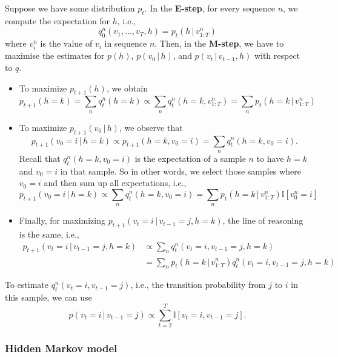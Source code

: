 \documentclass{article}
\newcommand{\giv}{\,|\,}
\begin{document}
Suppose we have some distribution $p_t$. In the \textbf{E-step}, for every sequence $n$, we compute the expectation for $h$, i.e., 
$$
    q_0^n(v_1, \dots, v_T, h) = p_t(h \giv v_{1:T}^n)
$$
\noindent where $v_i^n$ is the value of $v_i$ in sequence $n$. Then, in the \textbf{M-step}, we have to maximise the estimates for $p(h)$, $p(v_0 \giv h)$, and $p(v_t \giv v_{t-1}, h)$ with respect to $q$. 
\begin{itemize}
    \item To maximize $p_{t+1}(h)$, we obtain
    $$
        p_{t+1}(h=k) = \sum_n q_t^n(h=k) \propto \sum_n q_t^n(h=k, v_{1:T}^n) = \sum_n p_t(h=k \giv v_{1:T}^n)
    $$
    \item To maximize $p_{t+1}(v_0 \giv h)$, we observe that
    $$
        p_{t+1}(v_0 = i \giv h = k) \propto p_{t+1}(h = k, v_0 = i) = \sum_n q_t^n(h=k, v_0 = i).
    $$
    Recall that $q_t^n(h=k, v_0 = i)$ is the expectation of a sample $n$ to have $h=k$ and $v_0 = i$ in that sample. So in other words, we select those samples where $v_0=i$ and then sum up all expectations, i.e., 
    $$
        p_{t+1}(v_0 = i \giv h = k) \propto \sum_n q_t^n(h=k, v_0 = i) = \sum_n p_t(h=k \giv v_{1:T}^n) \mathbb{I}[v_0^n = i]
    $$
    \item Finally, for maximizing $p_{t+1}(v_t = i \giv v_{t-1} = j, h= k)$, the line of reasoning is the same, i.e., 
    \begin{align*}
        p_{t+1}(v_t = i \giv v_{t-1} = j, h= k) &\propto  \sum_n q_t^n(v_t = i, v_{t-1} = j, h = k) \\
        &= \sum_n p_t(h=k \giv v_{1:T}^n)q_t^n(v_t = i, v_{t-1} = j, h = k)
    \end{align*}
\end{itemize}
\noindent To estimate $q_t^n(v_t = i, v_{t-1} = j)$, i.e., the transition probability from $j$ to $i$ in this sample, we can use 
$$
    p(v_t = i \giv v_{t-1} = j) \propto \sum_{t=2}^T \mathbb{I}[v_t=i, v_{t-1} = j].
$$

\subsubsection{Hidden Markov model}
\end{document}
